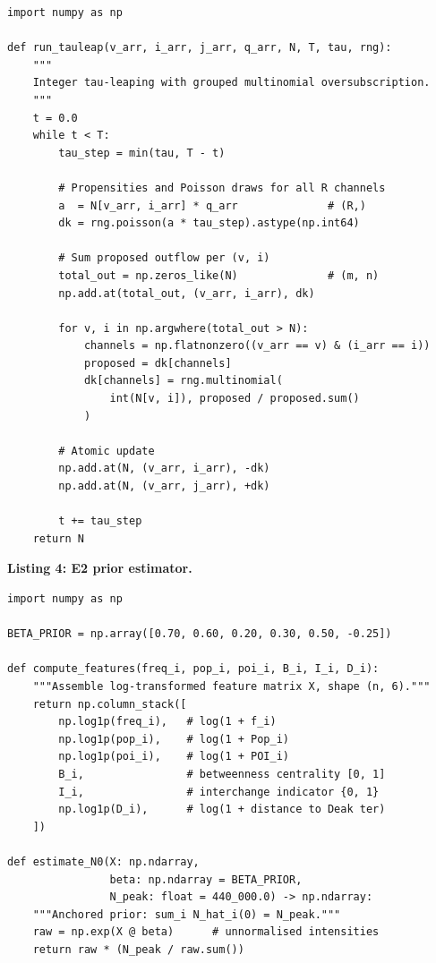 \documentclass[12pt,a4paper]{article}
\theoremstyle{plain}
\theoremstyle{definition}
\theoremstyle{remark}
\begin{document}
\begin{lstlisting}[caption={$\tau$-leaping with atomic outflow clamping
  (\texttt{bkk/simulate.py}).},label={lst:tauleap}]
import numpy as np

def run_tauleap(v_arr, i_arr, j_arr, q_arr, N, T, tau, rng):
    """
    Integer tau-leaping with grouped multinomial oversubscription.
    """
    t = 0.0
    while t < T:
        tau_step = min(tau, T - t)

        # Propensities and Poisson draws for all R channels
        a  = N[v_arr, i_arr] * q_arr              # (R,)
        dk = rng.poisson(a * tau_step).astype(np.int64)

        # Sum proposed outflow per (v, i)
        total_out = np.zeros_like(N)              # (m, n)
        np.add.at(total_out, (v_arr, i_arr), dk)

        for v, i in np.argwhere(total_out > N):
            channels = np.flatnonzero((v_arr == v) & (i_arr == i))
            proposed = dk[channels]
            dk[channels] = rng.multinomial(
                int(N[v, i]), proposed / proposed.sum()
            )

        # Atomic update
        np.add.at(N, (v_arr, i_arr), -dk)
        np.add.at(N, (v_arr, j_arr), +dk)

        t += tau_step
    return N
\end{lstlisting}

\textbf{Listing 4: E2 prior estimator.}

\begin{lstlisting}[caption={E2 prior estimator for $\hat{N}_i(0)$
  (\texttt{bkk/demand.py}).},label={lst:prior}]
import numpy as np

BETA_PRIOR = np.array([0.70, 0.60, 0.20, 0.30, 0.50, -0.25])

def compute_features(freq_i, pop_i, poi_i, B_i, I_i, D_i):
    """Assemble log-transformed feature matrix X, shape (n, 6)."""
    return np.column_stack([
        np.log1p(freq_i),   # log(1 + f_i)
        np.log1p(pop_i),    # log(1 + Pop_i)
        np.log1p(poi_i),    # log(1 + POI_i)
        B_i,                # betweenness centrality [0, 1]
        I_i,                # interchange indicator {0, 1}
        np.log1p(D_i),      # log(1 + distance to Deak ter)
    ])

def estimate_N0(X: np.ndarray,
                beta: np.ndarray = BETA_PRIOR,
                N_peak: float = 440_000.0) -> np.ndarray:
    """Anchored prior: sum_i N_hat_i(0) = N_peak."""
    raw = np.exp(X @ beta)      # unnormalised intensities
    return raw * (N_peak / raw.sum())
\end{lstlisting}
\end{document}
